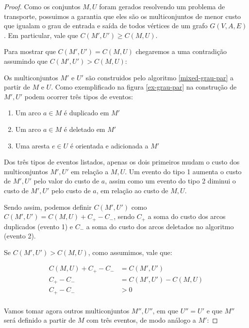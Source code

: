    \begin{proof}
        Como os conjuntos $M, U$ foram gerados resolvendo um problema de transporte, possuimos a garantia que eles são os multiconjuntos de menor custo que igualam o grau de entrada e saída de todos vértices de um grafo $G(V, A, E)$. 
        Em particular, vale que $C(M', U') \geq C(M, U)$. 

        Para mostrar que $C(M', U') = C(M, U)$ chegaremos a uma contradição assumindo que $C(M', U') > C(M, U)$:

        Os multiconjuntos $M'$ e $U'$ são construidos pelo algoritmo \ref{mixed-grau-par} a partir de $M$ e $U$. 
        Como exemplificado na figura \ref{ex-grau-par} na construção de $M', U'$ podem ocorrer três tipos de eventos:

        \begin{enumerate}
            \item Um arco $a \in M$ é duplicado em $M'$
            \item Um arco $a \in M$ é deletado em $M'$
            \item Uma aresta $e \in U$ é orientada e adicionada a $M'$
        \end{enumerate}
        
        Dos três tipos de eventos listados, apenas os dois primeiros mudam o custo dos multiconjuntos $M', U'$ em relação a $M, U$.
        Um evento do tipo 1 aumenta o custo de $M', U'$ pelo valor do custo de $a$, assim como um evento do tipo 2 diminui o custo de $M', U'$ pelo custo de $a$, em relação ao custo de $M, U$.

        Sendo assim, podemos definir $C(M', U')$ como $C(M', U') = C(M, U) + C_+ - C_-$, sendo $C_+$ a soma do custo dos arcos duplicados (evento 1) e $C_-$ a soma do custo dos arcos deletados no algoritmo (evento 2).

        Se $C(M', U') > C(M, U)$, como assumimos, vale que:

        \begin{align*}
            C(M, U) + C_+ - C_- &= C(M', U') \\
            C_+ - C_- &= C(M', U') - C(M, U) \\
            C_+ - C_- &> 0 \\ 
        \end{align*}

        Vamos tomar agora outros multiconjuntos $M'', U''$, em que $U'' = U'$ e que $M''$ será definido a partir de $M$ com três eventos, de modo análogo a $M'$:
        

\end{proof}
